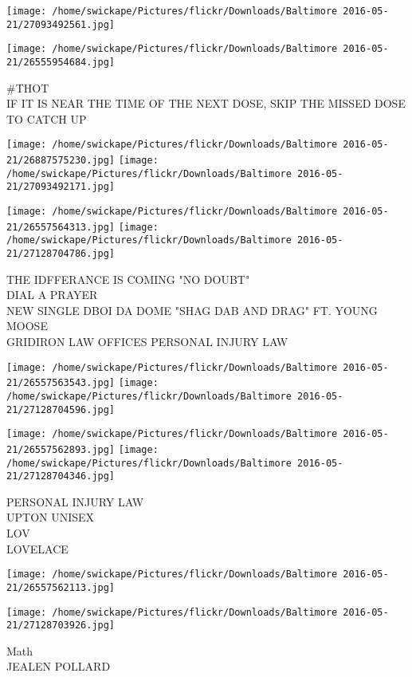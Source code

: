 \documentclass[10pt,letterpaper]{article}
\begin{document}
\texttt{[image: /home/swickape/Pictures/flickr/Downloads/Baltimore 2016-05-21/27093492561.jpg]}

\vspace{0.25in}
\texttt{[image: /home/swickape/Pictures/flickr/Downloads/Baltimore 2016-05-21/26555954684.jpg]}

\#THOT\\
IF IT IS NEAR THE TIME OF THE NEXT DOSE, SKIP THE MISSED DOSE TO CATCH UP
\pagebreak

\texttt{[image: /home/swickape/Pictures/flickr/Downloads/Baltimore 2016-05-21/26887575230.jpg]}
\texttt{[image: /home/swickape/Pictures/flickr/Downloads/Baltimore 2016-05-21/27093492171.jpg]}

\texttt{[image: /home/swickape/Pictures/flickr/Downloads/Baltimore 2016-05-21/26557564313.jpg]}
\texttt{[image: /home/swickape/Pictures/flickr/Downloads/Baltimore 2016-05-21/27128704786.jpg]}

THE IDFFERANCE IS COMING "NO DOUBT"\\
DIAL A PRAYER\\
NEW SINGLE DBOI DA DOME "SHAG DAB AND DRAG" FT. YOUNG MOOSE\\
GRIDIRON LAW OFFICES PERSONAL INJURY LAW
\pagebreak

\texttt{[image: /home/swickape/Pictures/flickr/Downloads/Baltimore 2016-05-21/26557563543.jpg]}
\texttt{[image: /home/swickape/Pictures/flickr/Downloads/Baltimore 2016-05-21/27128704596.jpg]}

\texttt{[image: /home/swickape/Pictures/flickr/Downloads/Baltimore 2016-05-21/26557562893.jpg]}
\texttt{[image: /home/swickape/Pictures/flickr/Downloads/Baltimore 2016-05-21/27128704346.jpg]}

PERSONAL INJURY LAW\\
UPTON UNISEX\\
LOV\\
LOVELACE
\pagebreak

\texttt{[image: /home/swickape/Pictures/flickr/Downloads/Baltimore 2016-05-21/26557562113.jpg]}

\vspace{0.25in}
\texttt{[image: /home/swickape/Pictures/flickr/Downloads/Baltimore 2016-05-21/27128703926.jpg]}

Math\\
JEALEN POLLARD
\pagebreak
\end{document}
